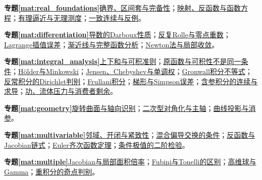 \par\noindent\textbf{专题\ref{mat:real_foundations}}\quad \hyperref[mat:real_foundations:complete]{确界、区间套与完备性}；\hyperref[mat:real_foundations:mapping]{映射、反函数与函数方程}；\hyperref[mat:real_foundations:approx]{有理逼近与无理测度}；\hyperref[mat:real_foundations:uniform]{一致连续与反例}。\par
\par\noindent\textbf{专题\ref{mat:differentiation}}\quad \hyperref[mat:differentiation:darboux]{导数的Darboux性质}；\hyperref[mat:differentiation:rolle]{反复Rolle与零点重数}；\hyperref[mat:differentiation:interpolate]{Lagrange插值误差}；\hyperref[mat:differentiation:asymptote]{渐近线与完整函数分析}；\hyperref[mat:differentiation:newton]{Newton法与局部收敛}。\par
\par\noindent\textbf{专题\ref{mat:integral_analysis}}\quad \hyperref[mat:integral_analysis:riemann]{上下和与可积准则}；\hyperref[mat:integral_analysis:primitive]{原函数与可积性不是同一条件}；\hyperref[mat:integral_analysis:holder]{Hölder与Minkowski}；\hyperref[mat:integral_analysis:jensen]{Jensen、Chebyshev与单调权}；\hyperref[mat:integral_analysis:gronwall]{Gronwall积分不等式}；\hyperref[mat:integral_analysis:dirichlet]{反常积分的Dirichlet判别}；\hyperref[mat:integral_analysis:frullani]{Frullani积分}；\hyperref[mat:integral_analysis:numerical]{梯形与Simpson误差}；\hyperref[mat:integral_analysis:parameter]{含参积分的连续与求导}；\hyperref[mat:integral_analysis:applications]{功、流体压力与消费者剩余}。\par
\par\noindent\textbf{专题\ref{mat:geometry}}\quad \hyperref[mat:geometry:rotation]{旋转曲面与轴向识别}；\hyperref[mat:geometry:quadratic]{二次型对角化与主轴}；\hyperref[mat:geometry:curve]{曲线投影与消参}。\par
\par\noindent\textbf{专题\ref{mat:multivariable}}\quad \hyperref[mat:multivariable:topology]{邻域、开闭与紧致性}；\hyperref[mat:multivariable:mixed]{混合偏导交换的条件}；\hyperref[mat:multivariable:jacobian]{反函数与Jacobian链式}；\hyperref[mat:multivariable:homogeneous]{Euler齐次函数定理}；\hyperref[mat:multivariable:constrained2]{条件极值的二阶检验}。\par
\par\noindent\textbf{专题\ref{mat:multiple}}\quad \hyperref[mat:multiple:jacproof]{Jacobian与局部面积倍率}；\hyperref[mat:multiple:tonelli]{Fubini与Tonelli的区别}；\hyperref[mat:multiple:nball]{高维球与Gamma}；\hyperref[mat:multiple:singular]{重积分的奇点判别}。\par
